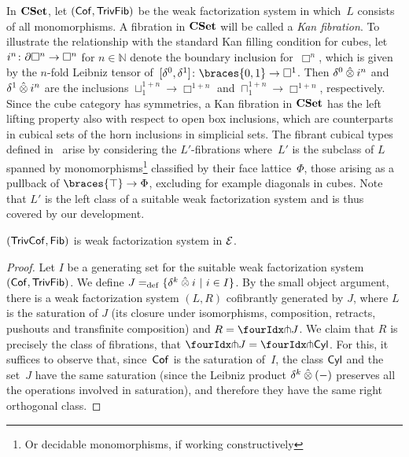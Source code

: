 \documentclass[reqno,10pt,a4paper,oneside,draft]{amsart}
\begin{document}
\begin{example}
In $\CSet$, let $(\Cof, \TrivFib)$ be the weak factorization system in which~$L$  consists of all monomorphisms.
A  fibration in $\CSet$ will be called a \emph{Kan fibration}.
To illustrate the relationship with the standard Kan filling condition for cubes, let $i^n \co \partial \Box^n \to \Box^n$ for $n \in \mathbb{N}$ denote the boundary inclusion for~$\Box^n$, which is given by the $n$-fold Leibniz tensor of~$[\lcyl, \rcyl] \co \braces{0, 1} \to \Box^1$.
Then $\lcyl \hatotimes i^n$ and $\rcyl \hatotimes i^n$ are the inclusions $\sqcup_1^{1+n} \to \Box^{1+n}$ and $\sqcap_1^{1+n} \to \Box^{1+n}$, respectively.
Since the cube category has symmetries, a Kan fibration in $\CSet$  has the left lifting property also with respect to open box inclusions, which are counterparts in cubical sets of the horn inclusions in simplicial sets.
The fibrant cubical types defined in~\cite{cohen-et-al:cubicaltt} arise by considering the  $L'$-fibrations where~$L'$ is the
subclass of $L$ spanned by monomorphisms\footnote{Or decidable monomorphisms, if working constructively} classified by their face lattice~$\Phi$, \ie those arising as a pullback of $\braces{\top} \to \Phi$, excluding for example diagonals in cubes.
Note that  $L'$ is the left class of a suitable weak factorization system and is thus covered by our development.
\end{example}

 
\begin{proposition} \label{thm:wfstimes} $(\TrivCof, \Fib)$ is weak factorization system in $\cal{E}$.
\end{proposition}

\begin{proof} Let $I$ be a generating set for the suitable weak factorization system $(\Cof, \TrivFib)$.
We  define $J \defeq \{ \delta^k \hatotimes i \ | \ i \in I \}$. By the small object argument, 
there is a weak factorization system $(L, R)$ cofibrantly generated by $J$, where
$L$ is the saturation of $J$ (\ie its closure under isomorphisms, composition, retracts, pushouts and transfinite composition) 
and $R = \liftr{J}$. 
We claim that $R$ is precisely the class of
fibrations, \ie that $\liftr{J} = \liftr{\Cyl}$. For this, it suffices to observe that, since~$\Cof$ is the saturation of~$I$, the class
$\Cyl$ and the set~$J$ have the same saturation (since the Leibniz product $\kcyl \hatotimes (-)$ preserves all the operations involved in saturation), and therefore they have the same right orthogonal class.
\end{proof}
\end{document}
